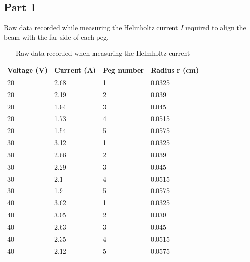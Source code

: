 \documentclass[letterpaper]{article}
\begin{document}
\subsection{Part 1}

Raw data recorded while measuring the Helmholtz current \textit{I} required
to align the beam with the far side of each peg.
\begin{table}[H]
\centering
\begin{tabular}{|l|l|l|l|}
\hline
Voltage (V) & Current (A) & Peg number & Radius r (cm) \\ \hline
20          & 2.68        & 1          & 0.0325        \\ \hline
20          & 2.19        & 2          & 0.039         \\ \hline
20          & 1.94        & 3          & 0.045         \\ \hline
20          & 1.73        & 4          & 0.0515        \\ \hline
20          & 1.54        & 5          & 0.0575        \\ \hline
30          & 3.12        & 1          & 0.0325        \\ \hline
30          & 2.66        & 2          & 0.039         \\ \hline
30          & 2.29        & 3          & 0.045         \\ \hline
30          & 2.1         & 4          & 0.0515        \\ \hline
30          & 1.9         & 5          & 0.0575        \\ \hline
40          & 3.62        & 1          & 0.0325        \\ \hline
40          & 3.05        & 2          & 0.039         \\ \hline
40          & 2.63        & 3          & 0.045         \\ \hline
40          & 2.35        & 4          & 0.0515        \\ \hline
40          & 2.12        & 5          & 0.0575        \\ \hline
\end{tabular}
\caption{Raw data recorded when measuring the Helmholtz current}
\end{table}
\end{document}
